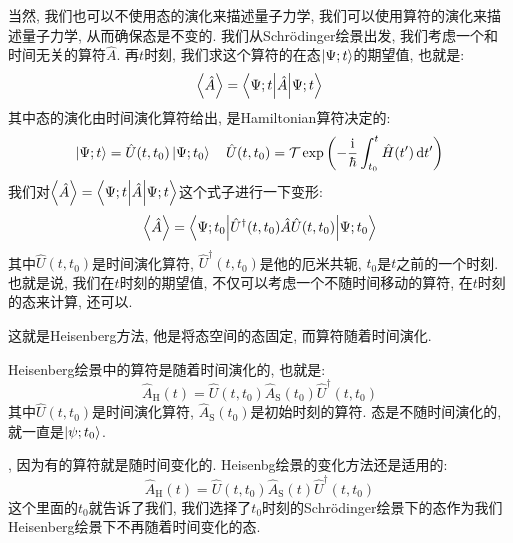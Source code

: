 当然, 我们也可以不使用态的演化来描述量子力学, 我们可以使用算符的演化来描述量子力学, 从而确保态是不变的.
我们从Schrödinger绘景出发, 我们考虑一个和时间无关的算符$\hat{A}$.
再$t$时刻, 我们求这个算符的在态$\ket{\Psi;t}$的期望值, 也就是:
\begin{equation}
  \expval{\hat{A}} = \mel**{\Psi;t}{\hat{A}}{\Psi;t}
\end{equation}
其中态的演化由时间演化算符给出, 是Hamiltonian算符决定的:
\begin{equation}
  \ket{\Psi;t} = \hat{U}(t,t_0) \ket{\Psi;t_0} \quad \hat{U}(t,t_0) = \mathcal{T} \exp\left( -\frac{\mathrm{i}}{\hbar} \int_{t_0}^{t} \hat{H}(t') \dd{t'} \right)
\end{equation}
我们对$\expval{\hat{A}} = \mel**{\Psi;t}{\hat{A}}{\Psi;t}$这个式子进行一下变形:
\begin{equation}
  \expval{\hat{A}} = \mel**{\Psi;t_0}{\hat{U}^\dagger(t,t_0) \hat{A} \hat{U}(t,t_0)}{\Psi;t_0}
\end{equation}
其中$\hat{U}(t,t_0)$是时间演化算符, $\hat{U}^\dagger(t,t_0)$是他的厄米共轭, $t_0$是$t$之前的一个时刻.
也就是说, 我们在$t$时刻的期望值, 不仅可以考虑一个不随时间移动的算符, 在$t$时刻的态来计算, 还可以.


这就是Heisenberg方法, 他是将态空间的态固定, 而算符随着时间演化.
\begin{definition}[][Heisenberg方法]
  Heisenberg绘景中的算符是随着时间演化的, 也就是:
  \begin{equation}
    \hat{A}_{\text{H}}(t) = \hat{U}(t,t_0) \hat{A}_{\text{S}}(t_0) \hat{U}^\dagger(t,t_0)
  \end{equation}
  其中$\hat{U}(t,t_0)$是时间演化算符, $\hat{A}_{\text{S}}(t_0)$是初始时刻的算符.
  态是不随时间演化的, 就一直是$\ket{\psi;t_0}$.
\end{definition}
, 因为有的算符就是随时间变化的.
Heisenbg绘景的变化方法还是适用的:
\begin{equation}
  \hat{A}_{\text{H}}(t) = \hat{U}(t,t_0) \hat{A}_{\text{S}}(t) \hat{U}^\dagger(t,t_0)
\end{equation}
这个里面的$t_0$就告诉了我们, 我们选择了$t_0$时刻的Schrödinger绘景下的态作为我们Heisenberg绘景下不再随着时间变化的态.

